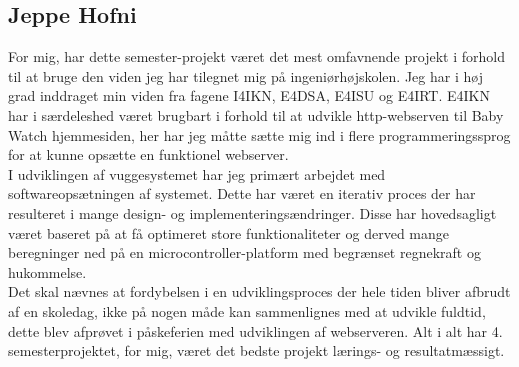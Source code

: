 \subsection*{Jeppe Hofni}
For mig, har dette semester-projekt været det mest omfavnende projekt i forhold til at bruge den viden jeg har tilegnet mig på ingeniørhøjskolen. Jeg har i høj grad inddraget min viden fra fagene I4IKN, E4DSA, E4ISU og E4IRT. E4IKN har i særdeleshed været brugbart i forhold til at udvikle http-webserven til Baby Watch hjemmesiden, her har jeg måtte sætte mig ind i flere programmeringssprog for at kunne opsætte en funktionel webserver.\\
I udviklingen af vuggesystemet har jeg primært arbejdet med softwareopsætningen af systemet. Dette har været en iterativ proces der har resulteret i mange design- og implementeringsændringer. Disse har hovedsagligt været baseret på at få optimeret store funktionaliteter og derved mange beregninger ned på en microcontroller-platform med begrænset regnekraft og hukommelse.\\
Det skal nævnes at fordybelsen i en udviklingsproces der hele tiden bliver afbrudt af en skoledag, ikke på nogen måde kan sammenlignes med at udvikle fuldtid, dette blev afprøvet i påskeferien med udviklingen af webserveren. Alt i alt har 4. semesterprojektet, for mig, været det bedste projekt lærings- og resultatmæssigt.

